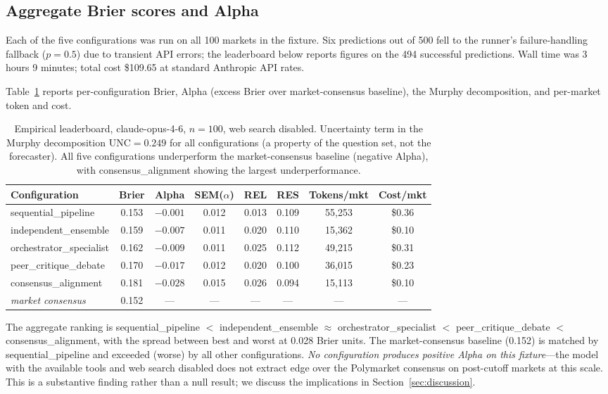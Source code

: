 \documentclass[11pt]{article}
\newcommand{\UNC}{\mathrm{UNC}}
\begin{document}
\subsection{Aggregate Brier scores and Alpha}
\label{sec:results-leaderboard}

Each of the five configurations was run on all 100 markets in the fixture. Six predictions out of 500 fell to the runner's failure-handling fallback ($p = 0.5$) due to transient API errors; the leaderboard below reports figures on the 494 successful predictions. Wall time was 3 hours 9 minutes; total cost \$109.65 at standard Anthropic API rates.

Table~\ref{tab:leaderboard} reports per-configuration Brier, Alpha (excess Brier over market-consensus baseline), the Murphy decomposition, and per-market token and cost.

\begin{table}[h]
\centering
\small
\begin{tabular}{lccccccc}
\toprule
Configuration & Brier & Alpha & SEM($\alpha$) & REL & RES & Tokens/mkt & Cost/mkt \\
\midrule
sequential\_pipeline      & 0.153 & $-0.001$ & 0.012 & 0.013 & 0.109 & 55{,}253 & \$0.36 \\
independent\_ensemble     & 0.159 & $-0.007$ & 0.011 & 0.020 & 0.110 & 15{,}362 & \$0.10 \\
orchestrator\_specialist  & 0.162 & $-0.009$ & 0.011 & 0.025 & 0.112 & 49{,}215 & \$0.31 \\
peer\_critique\_debate    & 0.170 & $-0.017$ & 0.012 & 0.020 & 0.100 & 36{,}015 & \$0.23 \\
consensus\_alignment      & 0.181 & $-0.028$ & 0.015 & 0.026 & 0.094 & 15{,}113 & \$0.10 \\
\midrule
\textit{market consensus} & 0.152 & --- & --- & --- & --- & --- & --- \\
\bottomrule
\end{tabular}
\caption{Empirical leaderboard, claude-opus-4-6, $n=100$, web search disabled. Uncertainty term in the Murphy decomposition $\UNC = 0.249$ for all configurations (a property of the question set, not the forecaster). All five configurations underperform the market-consensus baseline (negative Alpha), with consensus\_alignment showing the largest underperformance.}
\label{tab:leaderboard}
\end{table}

The aggregate ranking is sequential\_pipeline $<$ independent\_ensemble $\approx$ orchestrator\_specialist $<$ peer\_critique\_debate $<$ consensus\_alignment, with the spread between best and worst at 0.028 Brier units. The market-consensus baseline (0.152) is matched by sequential\_pipeline and exceeded (worse) by all other configurations. \emph{No configuration produces positive Alpha on this fixture}---the model with the available tools and web search disabled does not extract edge over the Polymarket consensus on post-cutoff markets at this scale. This is a substantive finding rather than a null result; we discuss the implications in Section~\ref{sec:discussion}.
\end{document}
